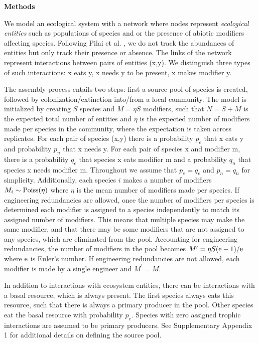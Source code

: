 \documentclass[twocolumn,preprintnumbers,amsmath,amssymb,superscriptaddress,linenumbers]{revtex4-1}
\newcommand{\rr}[1]{{\rm #1}}
\begin{document}
\vspace{-2mm}
\noindent \textbf{Methods}\\
  \footnotesize{
  We model an ecological system with a network where nodes represent \emph{ecological entities} such as populations of species and or the presence of abiotic modifiers affecting species.
  Following Pilai et al. \cite{Pillai2011}, we do not track the abundances of entities but only track their presence or absence.
  The links of the network represent interactions between pairs of entities (x,y).
  We distinguish three types of such interactions: x eats y, x needs y to be present, x makes modifier y.

  The assembly process entails two steps: first a source pool of species is created, followed by colonization/extinction into/from a local community.
  The model is initialized by creating $S$ species and $M = \eta S$ modifiers, such that $N=S+M$ is the expected total number of entities and $\eta$ is the expected number of modifiers made per species in the community, where the expectation is taken across replicates.
  For each pair of species (x,y) there is a probability $p_e$ that x eats y and probability $p_n$ that x needs y.
  For each pair of species x and modifier m, there is a probability $q_e$ that species x eats modifier m and a probability $q_n$ that species x needs modifier m.
  Throughout we assume that $p_e = q_e$ and $p_n = q_n$ for simplicity.
  Additionally, each species $i$ makes a number of modifiers $M_i \sim \rr{Poiss}(\eta)$ where $\eta$ is the mean number of modifiers made per species.
  If engineering redundancies are allowed, once the number of modifiers per species is determined each modifier is assigned to a species independently to match its assigned number of modifiers.
  This means that multiple species may make the same modifier, and that there may be some modifiers that are not assigned to any species, which are eliminated from the pool.
  Accounting for engineering redundancies, the number of modifiers in the pool becomes $M^\prime = \eta S (\rr{e}-1)/\rr{e}$ where $\rr{e}$ is Euler's number.
  If engineering redundancies are not allowed, each modifier is made by a single engineer and $M^\prime = M$.
  
  In addition to interactions with ecosystem entities, there can be interactions with a basal resource, which is always present.
  The first species always eats this resource, such that there is always a primary producer in the pool.
  Other species eat the basal resource with probability $p_e$.
  Species with zero assigned trophic interactions are assumed to be primary producers.
  See Supplementary Appendix 1 for additional details on defining the source pool.

}
\end{document}
